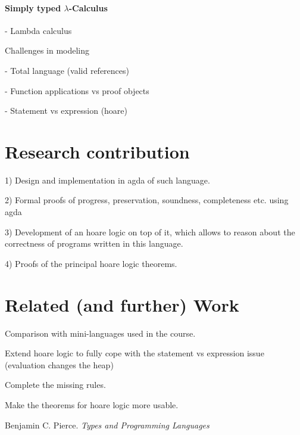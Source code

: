 \documentclass[12pt, a4paper, oneside]{article}
\begin{document}
\paragraph{Simply typed $\lambda$-Calculus}








		- Lambda calculus

		Challenges in modeling

			- Total language (valid references)

			- Function applications vs proof objects

			- Statement vs expression (hoare)


\section{Research contribution}


1) Design and implementation in agda of such language.

2) Formal proofs of progress, preservation, soundness, completeness etc. using agda 

3) Development of an hoare logic on top of it, which allows to reason about the correctness of programs written in this language. 

4) Proofs of the principal hoare logic theorems.


\section{Related (and further) Work}

Comparison with mini-languages used in the course.

Extend hoare logic to fully cope with the statement vs expression issue (evaluation changes the heap) 

Complete the missing rules. 

Make the theorems for hoare logic more usable.



\begin{thebibliography}{1}

  Benjamin C. Pierce.
  \emph{Types and Programming Languages}

\end{thebibliography}
\end{document}

